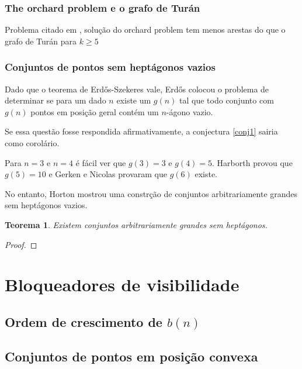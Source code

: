 \documentclass[a4paper]{book}
\newtheorem{teorema}{Teorema}
\begin{document}
\subsection{The orchard problem e o grafo de Turán}
Problema citado em \cite{visblock}, solução do orchard problem tem menos arestas do que o grafo de Turán para $k\geq 5$

\subsection{Conjuntos de pontos sem heptágonos vazios}
Dado que o teorema de Erd\H os-Szekeres vale, Erd\H os colocou o problema de determinar se para um dado $n$ existe um $g(n)$ tal que todo conjunto com $g(n)$ pontos em posição geral contém um $n$-ágono vazio.

Se essa questão fosse respondida afirmativamente, a conjectura \ref{conj1} sairia como corolário.

Para $n=3$ e $n=4$ é fácil ver que $g(3)=3$ e $g(4)=5$. Harborth\cite{Harborth1978} provou que $g(5)=10$ e Gerken\cite{Gerken} e Nicolas\cite{Nicolas} provaram que $g(6)$ existe.

No entanto, Horton\cite{heptagon} mostrou uma constrção de conjuntos arbitrariamente grandes sem heptágonos vazios.

\begin{teorema}
    Existem conjuntos arbitrariamente grandes sem heptágonos.
\end{teorema}
\begin{proof}

\end{proof}
\chapter{Bloqueadores de visibilidade}

\section{Ordem de crescimento de $b(n)$}
\cite{block,blockers}

\section{Conjuntos de pontos em posição convexa}
\cite{block,blockers}



{}
\end{document}
